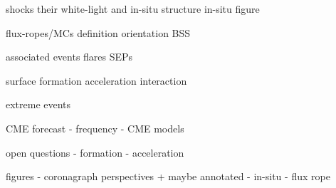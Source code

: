 shocks
their white-light and in-situ structure
in-situ figure

flux-ropes/MCs
definition
orientation
BSS


associated events
flares
SEPs

surface formation
acceleration
interaction



extreme events

CME forecast
- frequency
- CME models

open questions
- formation
- acceleration


figures
- coronagraph perspectives + maybe annotated
- in-situ
- flux rope

